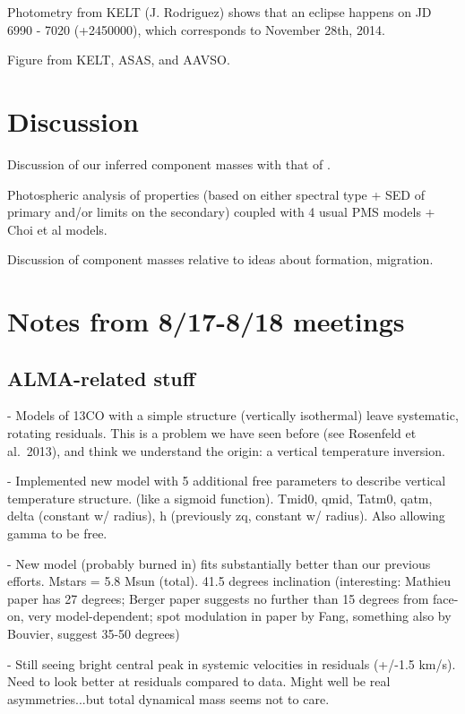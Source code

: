 \documentclass{aastex6}
\begin{document}
Photometry from KELT (J. Rodriguez) shows that an eclipse happens on JD 6990 - 7020 (+2450000), which corresponds to November 28th, 2014.

Figure from KELT, ASAS, and AAVSO.

\section{Discussion}

Discussion of our inferred component masses with that of \citet{berger11}.

Photospheric analysis of properties (based on either spectral type + SED of primary and/or limits on the secondary) coupled with 4 usual PMS models + Choi et al models.

Discussion of component masses relative to ideas about formation, migration.


\section{Notes from 8/17-8/18 meetings}

\subsection{ALMA-related stuff}

- Models of 13CO with a simple structure (vertically isothermal) leave systematic, rotating residuals.  This is a problem we have seen before (see Rosenfeld et al.~2013), and think we understand the origin: a vertical temperature inversion.

- Implemented new model with 5 additional free parameters to describe vertical temperature structure.  (like a sigmoid function).  {Tmid0, qmid, Tatm0, qatm, delta (constant w/ radius), h (previously zq, constant w/ radius)}.  Also allowing gamma to be free.

- New model (probably burned in) fits substantially better than our previous efforts.  Mstars = 5.8 Msun (total).  41.5 degrees inclination (interesting: Mathieu paper has 27 degrees; Berger paper suggests no further than 15 degrees from face-on, very model-dependent; spot modulation in paper by Fang, something also by Bouvier, suggest 35-50 degrees)

- Still seeing bright central peak in systemic velocities in residuals (+/-1.5 km/s).  Need to look better at residuals compared to data.  Might well be real asymmetries...but total dynamical mass seems not to care.
\end{document}
